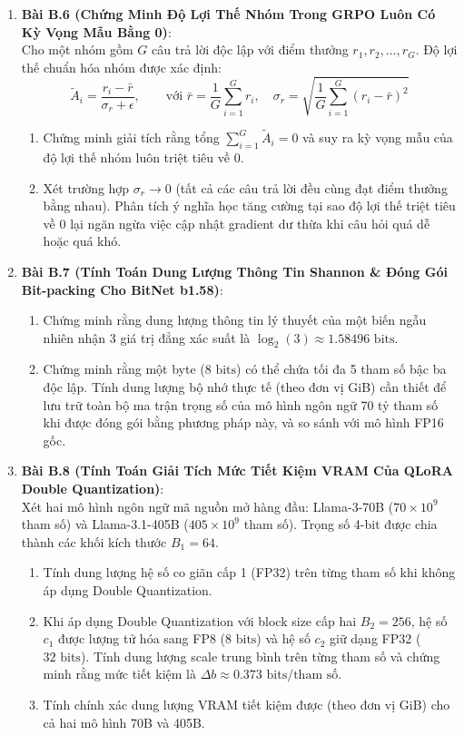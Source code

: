 \begin{enumerate}
  \item \textbf{Bài B.6 (Chứng Minh Độ Lợi Thế Nhóm Trong GRPO Luôn Có Kỳ Vọng Mẫu Bằng 0)}: \\
  Cho một nhóm gồm $G$ câu trả lời độc lập với điểm thưởng $r_1, r_2, \dots, r_G$. Độ lợi thế chuẩn hóa nhóm được xác định:
  \begin{equation*}
  \widetilde{A}_i = \frac{r_i - \bar{r}}{\sigma_r + \epsilon}, \qquad \text{với } \bar{r} = \frac{1}{G}\sum_{i=1}^G r_i, \quad \sigma_r = \sqrt{\frac{1}{G}\sum_{i=1}^G (r_i - \bar{r})^2}
  \end{equation*}
  \begin{enumerate}
    \item Chứng minh giải tích rằng tổng $\sum_{i=1}^G \widetilde{A}_i = 0$ và suy ra kỳ vọng mẫu của độ lợi thế nhóm luôn triệt tiêu về $0$.
    \item Xét trường hợp $\sigma_r \to 0$ (tất cả các câu trả lời đều cùng đạt điểm thưởng bằng nhau). Phân tích ý nghĩa học tăng cường tại sao độ lợi thế triệt tiêu về $0$ lại ngăn ngừa việc cập nhật gradient dư thừa khi câu hỏi quá dễ hoặc quá khó.
  \end{enumerate}

  \item \textbf{Bài B.7 (Tính Toán Dung Lượng Thông Tin Shannon \& Đóng Gói Bit-packing Cho BitNet b1.58)}: \\
  \begin{enumerate}
    \item Chứng minh rằng dung lượng thông tin lý thuyết của một biến ngẫu nhiên nhận 3 giá trị đẳng xác suất là $\log_2(3) \approx 1.58496\text{ bits}$.
    \item Chứng minh rằng một byte ($8\text{ bits}$) có thể chứa tối đa 5 tham số bậc ba độc lập. Tính dung lượng bộ nhớ thực tế (theo đơn vị GiB) cần thiết để lưu trữ toàn bộ ma trận trọng số của mô hình ngôn ngữ 70 tỷ tham số khi được đóng gói bằng phương pháp này, và so sánh với mô hình FP16 gốc.
  \end{enumerate}

  \item \textbf{Bài B.8 (Tính Toán Giải Tích Mức Tiết Kiệm VRAM Của QLoRA Double Quantization)}: \\
  Xét hai mô hình ngôn ngữ mã nguồn mở hàng đầu: Llama-3-70B ($70 \times 10^9$ tham số) và Llama-3.1-405B ($405 \times 10^9$ tham số).
  Trọng số 4-bit được chia thành các khối kích thước $B_1 = 64$.
  \begin{enumerate}
    \item Tính dung lượng hệ số co giãn cấp 1 (FP32) trên từng tham số khi không áp dụng Double Quantization.
    \item Khi áp dụng Double Quantization với block size cấp hai $B_2 = 256$, hệ số $c_1$ được lượng tử hóa sang FP8 ($8\text{ bits}$) và hệ số $c_2$ giữ dạng FP32 ($32\text{ bits}$). Tính dung lượng scale trung bình trên từng tham số và chứng minh rằng mức tiết kiệm là $\Delta b \approx 0.373\text{ bits/tham số}$.
    \item Tính chính xác dung lượng VRAM tiết kiệm được (theo đơn vị GiB) cho cả hai mô hình 70B và 405B.
  \end{enumerate}


\end{enumerate}
